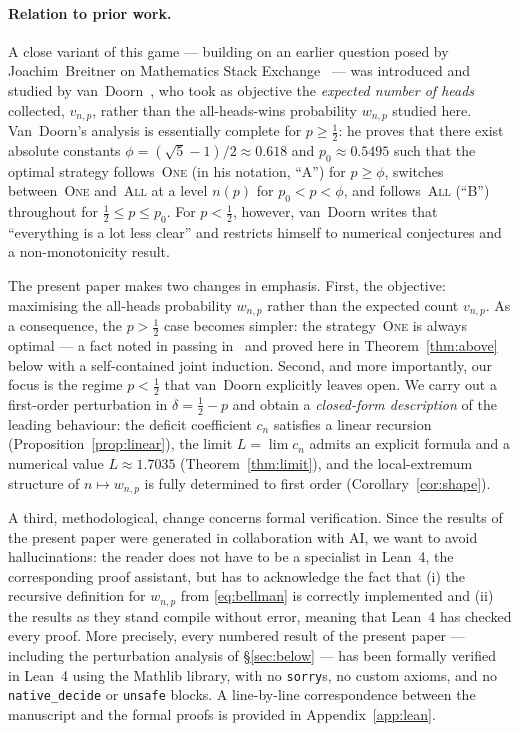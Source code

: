 \documentclass[12pt]{article}
\theoremstyle{definition}
\theoremstyle{remark}
\newcommand{\One}{\textsc{One}}
\newcommand{\All}{\textsc{All}}
\begin{document}
\paragraph{Relation to prior work.}
\sloppy A close variant of this game --- building on an earlier
question posed by Joachim~Breitner on Mathematics Stack
Exchange~\cite{Breitner2015} --- was introduced and studied by
van~Doorn~\cite{vanDoorn2024}, who took as objective the
\emph{expected number of heads} collected, $v_{n,p}$, rather than
the all-heads-wins probability $w_{n,p}$ studied here.  Van~Doorn's
analysis is essentially complete for $p\ge\tfrac12$: he proves
that there exist absolute constants $\phi=(\sqrt5-1)/2\approx
0.618$ and $p_0\approx 0.5495$ such that the optimal strategy
follows~\One{} (in his notation, ``A'') for $p\ge\phi$, switches
between~\One{} and~\All{} at a level $n(p)$ for $p_0<p<\phi$, and
follows~\All{} (``B'') throughout for $\tfrac12\le p\le p_0$.  For
$p<\tfrac12$, however, van~Doorn writes that ``everything is a lot
less clear'' and restricts himself to numerical conjectures and a
non-monotonicity result.

The present paper makes two changes in emphasis.  First, the
objective: maximising the all-heads probability $w_{n,p}$ rather
than the expected count $v_{n,p}$. As a consequence, the $p>\tfrac12$ case becomes simpler: 
the strategy~\One{} is always optimal --- a fact noted in passing
in~\cite[\S 10]{vanDoorn2024} and proved here in
Theorem~\ref{thm:above} below with a self-contained joint
induction. Second, and more importantly, our focus is the regime
$p<\tfrac12$ that van~Doorn explicitly leaves open.  We carry out
a first-order perturbation in $\delta=\tfrac12-p$ and obtain a
\emph{closed-form description} of the leading behaviour: the
deficit coefficient $c_n$ satisfies a linear recursion
(Proposition~\ref{prop:linear}), the limit $L=\lim c_n$ admits an
explicit formula and a numerical value $L\approx
1.7035$ (Theorem~\ref{thm:limit}), and the local-extremum
structure of $n\mapsto w_{n,p}$ is fully determined to first order
(Corollary~\ref{cor:shape}).

A third, methodological, change concerns formal verification.
Since the results of the present paper were generated in collaboration with AI,
we want to avoid hallucinations: the reader does not have to be a specialist in Lean~4, 
the corresponding proof assistant, but has to acknowledge the fact that (i) the recursive definition
for $w_{n,p}$ from \eqref{eq:bellman} is correctly implemented and (ii) the results as they stand 
compile without error, meaning that Lean~4 has checked every proof. 
More precisely, every numbered result
of the present paper --- including the perturbation analysis of
\S\ref{sec:below} --- has been formally verified in Lean~4 using
the Mathlib library, with no \texttt{sorry}s, no custom axioms,
and no \texttt{native\_decide} or \texttt{unsafe} blocks.  A
line-by-line correspondence between the manuscript and the formal
proofs is provided in Appendix~\ref{app:lean}.
\end{document}
